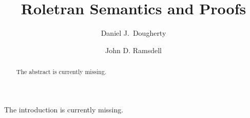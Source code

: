 \documentclass[12pt]{report}
\title{Roletran Semantics and Proofs}
\author{Daniel J.~Dougherty\and John D. Ramsdell}
\begin{document}
\maketitle

\begin{abstract}
  The abstract is currently missing.
\end{abstract}

\tableofcontents


The introduction is currently missing.


\end{document}
